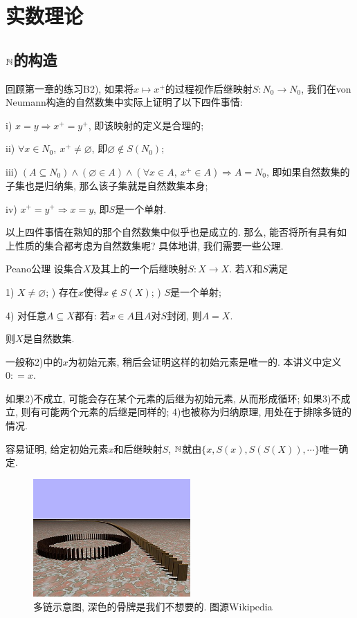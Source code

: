 \chapter{实数理论}

\section{$\mathbb{N}$的构造}

回顾第一章的练习B2), 如果将$x \mapsto x^+$的过程视作后继映射$S: N_0 \to N_0$, 我们在von Neumann构造的自然数集中实际上证明了以下四件事情: 

i) $x=y \Rightarrow x^+ = y^+$, 即该映射的定义是合理的; 

ii) $\forall x \in N_0, ~x^+ \neq \varnothing$, 即$\varnothing \notin S(N_0)$; 

iii) $(A \subseteq N_0) \wedge (\varnothing \in A) \wedge (\forall x \in A, ~x^+ \in A) \Rightarrow A=N_0$, 即如果自然数集的子集也是归纳集, 那么该子集就是自然数集本身; 

iv) $x^+=y^+ \Rightarrow x=y$, 即$S$是一个单射.

以上四件事情在熟知的那个自然数集中似乎也是成立的. 那么, 能否将所有具有如上性质的集合都考虑为自然数集呢? 具体地讲, 我们需要一些公理.

\begin{axiom}{Peano公理}
	设集合$X$及其上的一个后继映射$S:X \to X$. 若$X$和$S$满足
	
	1) $X \neq \varnothing$; ) 存在$x$使得$x \notin S(X)$; ) $S$是一个单射; 
	
	4) 对任意$A \subseteq X$都有: 若$x \in A$且$A$对$S$封闭, 则$A=X$. 
	
	\noindent
	则$X$是自然数集. 
\end{axiom}
\begin{remark}
	一般称2)中的$x$为初始元素, 稍后会证明这样的初始元素是唯一的. 本讲义中定义$0: =x$.
\end{remark}

如果2)不成立, 可能会存在某个元素的后继为初始元素, 从而形成循环; 如果3)不成立, 则有可能两个元素的后继是同样的; 4)也被称为归纳原理, 用处在于排除多链的情况. 

容易证明, 给定初始元素$x$和后继映射$S$, $\mathbb{N}$就由$\{ x,S(x),S(S(X)),\cdots \}$唯一确定. 

\begin{figure}[h!]
	\centering
	\includegraphics[width=6cm]{attachment/440px-Domino_effect_visualizing_exclusion_of_junk_term_by_induction_axiom.jpg}
	\caption{多链示意图, 深色的骨牌是我们不想要的. 图源Wikipedia}
\end{figure}



